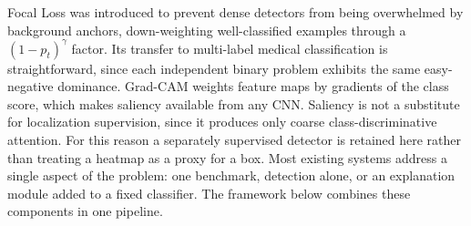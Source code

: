 \documentclass[conference]{IEEEtran}
\begin{document}
Focal Loss \cite{lin2017focal} was introduced to prevent dense detectors from
being overwhelmed by background anchors, down-weighting well-classified
examples through a $(1-p_t)^\gamma$ factor. Its transfer to multi-label medical
classification is straightforward, since each independent binary problem
exhibits the same easy-negative dominance. Grad-CAM \cite{selvaraju2017}
weights feature maps by gradients of the class score, which makes saliency
available from any CNN. Saliency is not a substitute for localization
supervision, since it produces only coarse class-discriminative attention. For
this reason a separately supervised detector is retained here rather than
treating a heatmap as a proxy for a box. Most existing systems address a single
aspect of the problem: one benchmark, detection alone, or an explanation module
added to a fixed classifier. The framework below combines these components in one
pipeline.
\end{document}
